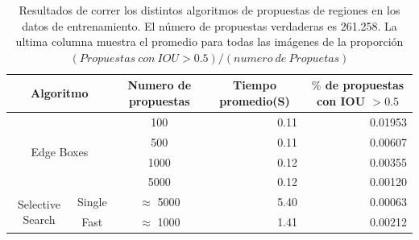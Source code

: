 \begin{table}[H]
	\centering
	\resizebox{\textwidth}{!} {
		\begin{tabular}{|c|c|c|r|r|}
			\hline
			\multicolumn{2}{|c|}{Algoritmo}                   & Numero de propuestas & \multicolumn{1}{c|}{Tiempo promedio(S)} & \multicolumn{1}{c|}{$\%$ de propuestas con IOU $> 0.5$} \\ \hline
			\multicolumn{2}{|c|}{\multirow{4}{*}{Edge Boxes}} & 100                  & 0.11                                    & 0.01953                                                \\ \cline{3-5} 
			\multicolumn{2}{|c|}{}                            & 500                  & 0.11                                    & 0.00607                                                \\ \cline{3-5} 
			\multicolumn{2}{|c|}{}                            & 1000                 & 0.12                                    & 0.00355                                                \\ \cline{3-5} 
			\multicolumn{2}{|c|}{}                            & 5000                 & 0.12                                    & 0.00120                                                \\ \hline
			\multirow{2}{*}{Selective Search}     & Single    & $\approx$ 5000       & 5.40                                    & 0.00063                                                \\ \cline{2-5} 
			& Fast      & $\approx$ 1000       & 1.41                                    & 0.00212                                                \\ \hline
		\end{tabular}
	}                                                 
	\caption{Resultados de correr los distintos algoritmos de propuestas de regiones en los datos de entrenamiento. El número de propuestas verdaderas es 261.258. La ultima columna muestra el promedio para todas las imágenes de la proporción $(Propuestas\ con\ IOU > 0.5) / (numero\ de\ Propuetas)$}
	\label{tabla:edgeVSselct}
\end{table}

